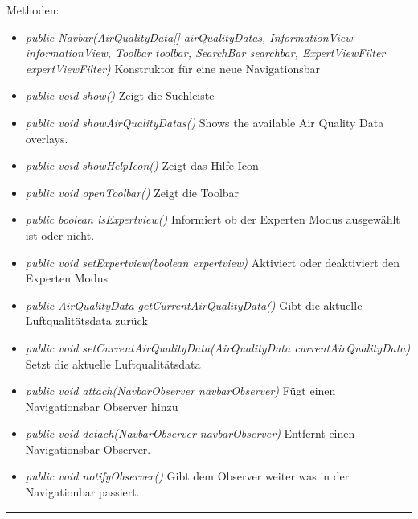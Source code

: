 Methoden: \begin{itemize} [noitemsep]
    \item \emph{public Navbar(AirQualityData[] airQualityDatas, InformationView informationView, Toolbar toolbar, SearchBar searchbar, ExpertViewFilter expertViewFilter)} Konstruktor für eine neue Navigationsbar
    \item \emph{public void show()} Zeigt die Suchleiste
    \item \emph{public void showAirQualityDatas()} Shows the available Air Quality Data overlays.
    \item \emph{public void showHelpIcon()} Zeigt das Hilfe-Icon
    \item \emph{public void openToolbar()} Zeigt die Toolbar
    \item \emph{public boolean isExpertview()} Informiert ob der Experten Modus ausgewählt ist oder nicht.
    \item \emph{public void setExpertview(boolean expertview)} Aktiviert oder deaktiviert den Experten Modus
    \item \emph{public AirQualityData getCurrentAirQualityData()} Gibt die aktuelle Luftqualitätsdata zurück
    \item \emph{public void setCurrentAirQualityData(AirQualityData currentAirQualityData)} Setzt die aktuelle Luftqualitätsdata
    \item \emph{public void attach(NavbarObserver navbarObserver)} Fügt einen Navigationsbar Observer hinzu
    \item \emph{public void detach(NavbarObserver navbarObserver)} Entfernt einen Navigationsbar Observer.
    \item \emph{public void notifyObserver()} Gibt dem Observer weiter was in der Navigationbar passiert.
\end{itemize}

\rule{\textwidth}{0.4pt}
